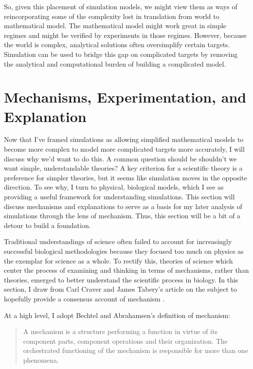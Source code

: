 So, given this placement of simulation models, we might view them as
ways of reincorporating some of the complexity lost in translation from
world to mathematical model. The mathematical model might work great in
simple regimes and might be verified by experiments in those regimes.
However, because the world is complex, analytical solutions often
oversimplify certain targets. Simulation can be used to bridge this gap
on complicated targets by removing the analytical and computational
burden of building a complicated model.

\hypertarget{mechanisms-experimentation-and-explanation}{%
\section{Mechanisms, Experimentation, and
Explanation}\label{mechanisms-experimentation-and-explanation}}

Now that I've framed simulations as allowing simplified mathematical
models to become more complex to model more complicated targets more
accurately, I will discuss why we'd want to do this. A common question
should be shouldn't we want simple, understandable theories? A key
criterion for a scientific theory is a preference for simpler theories,
but it seems like simulation moves in the opposite direction. To see
why, I turn to physical, biological models, which I see as providing a
useful framework for understanding simulations. This section will
discuss mechanisms and explanations to serve as a basis for my later
analysis of simulations through the lens of mechanism. Thus, this
section will be a bit of a detour to build a foundation.

Traditional understandings of science often failed to account for
increasingly successful biological methodologies because they focused
too much on physics as the exemplar for science as a whole. To rectify
this, theories of science which center the process of examining and
thinking in terms of mechanisms, rather than theories, emerged to better
understand the scientific process in biology. In this section, I draw
from Carl Craver and James Tabery's article on the subject to hopefully
provide a consensus account of mechanism
\autocite{craverMechanismsScience2019}.

At a high level, I adopt Bechtel and Abrahamsen's definition of
mechanism:

\begin{quote}
A mechanism is a structure performing a function in virtue of its
component parts, component operations and their organization. The
orchestrated functioning of the mechanism is responsible for more than
one phenomena. \autocite{bechtelExplanationMechanistAlternative2005}
\end{quote}


